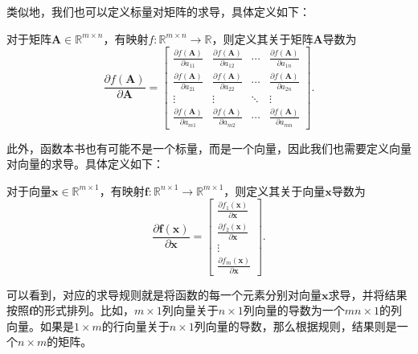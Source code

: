 类似地，我们也可以定义标量对矩阵的求导，具体定义如下：

\begin{definition}[标量关于矩阵求导]
    对于矩阵$\mathbf{A} \in \mathbb{R}^{m \times n}$，有映射\( f: \mathbb{R}^{m \times n} \rightarrow \mathbb{R} \)，则定义其关于矩阵\( \mathbf{A} \)导数为
    \[
        \frac{\partial f(\mathbf{A})}{\partial \mathbf{A}} = \begin{bmatrix}
            \frac{\partial f(\mathbf{A})}{\partial a_{11}} & \frac{\partial f(\mathbf{A})}{\partial a_{12}} & \cdots & \frac{\partial f(\mathbf{A})}{\partial a_{1n}} \\
            \frac{\partial f(\mathbf{A})}{\partial a_{21}} & \frac{\partial f(\mathbf{A})}{\partial a_{22}} & \cdots & \frac{\partial f(\mathbf{A})}{\partial a_{2n}} \\
            \vdots                                         & \vdots                                         & \ddots & \vdots                                         \\
            \frac{\partial f(\mathbf{A})}{\partial a_{m1}} & \frac{\partial f(\mathbf{A})}{\partial a_{m2}} & \cdots & \frac{\partial f(\mathbf{A})}{\partial a_{mn}}
        \end{bmatrix}.
    \]
\end{definition}

此外，函数本书也有可能不是一个标量，而是一个向量，因此我们也需要定义向量对向量的求导。具体定义如下：

\begin{definition}[向量关于向量求导]
    对于向量\( \bm{x} \in \mathbb{R}^{m \times 1} \)，有映射\( \bm{f}: \mathbb{R}^{n \times 1} \rightarrow \mathbb{R}^{m \times 1} \)，则定义其关于向量\( \bm{x} \)导数为
    \[
        \frac{\partial \bm{f}(\bm{x})}{\partial \bm{x}} = \begin{bmatrix}
            \frac{\partial f_1(\bm{x})}{\partial \bm{x}} \\
            \frac{\partial f_2(\bm{x})}{\partial \bm{x}} \\
            \vdots                                       \\
            \frac{\partial f_m(\bm{x})}{\partial \bm{x}}
        \end{bmatrix}.
    \]
\end{definition}
可以看到，对应的求导规则就是将函数的每一个元素分别对向量\( \bm{x} \)求导，并将结果按照\( \bm{f} \)的形式排列。比如，\( m \times 1 \)列向量关于\( n \times 1 \)列向量的导数为一个\( mn \times 1 \)的列向量。如果是\( 1 \times m \)的行向量关于\( n \times 1 \)列向量的导数，那么根据规则，结果则是一个\( n \times m \)的矩阵。

